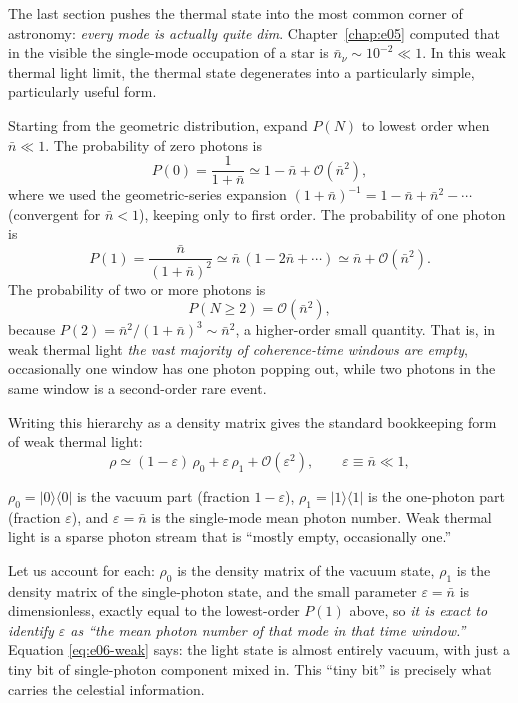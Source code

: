 The last section pushes the thermal state into the most common corner of astronomy: \emph{every mode is actually quite dim}. Chapter~\ref{chap:e05} computed that in the visible the single-mode occupation of a star is \(\bar n_\nu\sim10^{-2}\ll1\). In this weak thermal light limit, the thermal state degenerates into a particularly simple, particularly useful form.

Starting from the geometric distribution, expand \(P(N)\) to lowest order when \(\bar n\ll 1\). The probability of zero photons is
\[
  P(0)=\frac{1}{1+\bar n}\simeq 1-\bar n+\mathcal O(\bar n^{2}),
\]
where we used the geometric-series expansion \((1+\bar n)^{-1}=1-\bar n+\bar n^2-\cdots\) (convergent for \(\bar n<1\)), keeping only to first order. The probability of one photon is
\[
  P(1)=\frac{\bar n}{(1+\bar n)^{2}}
  \simeq\bar n\,(1-2\bar n+\cdots)
  \simeq\bar n+\mathcal O(\bar n^{2}).
\]
The probability of two or more photons is
\[
  P(N\ge 2)=\mathcal O(\bar n^{2}),
\]
because \(P(2)=\bar n^2/(1+\bar n)^3\sim\bar n^2\), a higher-order small quantity. That is, in weak thermal light \emph{the vast majority of coherence-time windows are empty}, occasionally one window has one photon popping out, while two photons in the same window is a second-order rare event.

Writing this hierarchy as a density matrix gives the standard bookkeeping form of weak thermal light:
\begin{equation}
  \rho\simeq(1-\varepsilon)\,\rho_0+\varepsilon\,\rho_1+\mathcal O(\varepsilon^{2}),
  \qquad
  \varepsilon\equiv\bar n\ll 1,
  \label{eq:e06-weak}
\end{equation}
\begin{formulaexplain}
\(\rho_0=|0\rangle\langle 0|\) is the vacuum part (fraction \(1-\varepsilon\)), \(\rho_1=|1\rangle\langle 1|\) is the one-photon part (fraction \(\varepsilon\)), and \(\varepsilon=\bar n\) is the single-mode mean photon number. Weak thermal light is a sparse photon stream that is ``mostly empty, occasionally one.''
\end{formulaexplain}

Let us account for each: \(\rho_0\) is the density matrix of the vacuum state, \(\rho_1\) is the density matrix of the single-photon state, and the small parameter \(\varepsilon=\bar n\) is dimensionless, exactly equal to the lowest-order \(P(1)\) above, so \emph{it is exact to identify \(\varepsilon\) as ``the mean photon number of that mode in that time window.''} Equation \eqref{eq:e06-weak} says: the light state is almost entirely vacuum, with just a tiny bit of single-photon component mixed in. This ``tiny bit'' is precisely what carries the celestial information.


